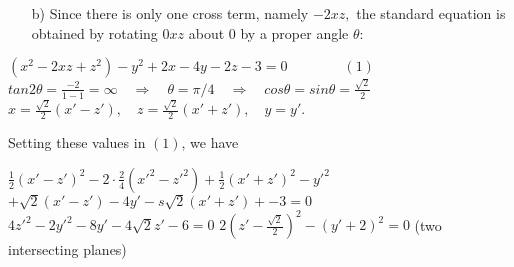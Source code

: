 \documentclass[11pt]{amsbook}
\begin{document}
\begin{itemize}

\item[b)] Since there is only one cross term, namely $-2xz,$ the standard equation is obtained by rotating $0xz$ about $0$ by a proper angle $\theta$:
\end{itemize}	
\hNewLine
	\begin{center}
	$(x^2-2xz+z^2)-y^2+2x-4y-2z-3=0 \quad\quad\quad\quad(1)$
	\hNewLine
	\hNewLine
	$tan2\theta=\frac{-2}{1-1}=\infty \quad \Rightarrow \quad \theta=\pi/4 \quad \Rightarrow \quad cos\theta=sin\theta=\frac{\sqrt{2}}{2}$
	\hNewLine
	\hNewLine
	$x=\frac{\sqrt{2}}{2}(x\prime-z\prime), \quad z=\frac{\sqrt{2}}{2}(x\prime+z\prime), \quad y=y\prime.$
	\end{center}
\hNewLine
Setting these values in $(1)$, we have
\hNewLine
	\begin{center}
	$\frac{1}{2}(x\prime-z\prime)^2-2\cdot\frac{2}{4}(x\prime^2-z\prime^2)+\frac{1}{2}(x\prime+z\prime)^2-y\prime^2$
	\hNewLine
	\hNewLine
	$+\sqrt{2}(x\prime-z\prime)-4y\prime-s\sqrt{2}(x\prime+z\prime)+-3=0$
	\hNewLine
	\hNewLine
	$4z\prime^2-2y\prime^2-8y\prime-4\sqrt{2}z\prime-6=0$
	\hNewLine
	\hNewLine
	$2(z\prime-\frac{\sqrt{2}}{2})^2-(y\prime+2)^2=0$ (two intersecting planes)
	\end{center}
\end{document}
